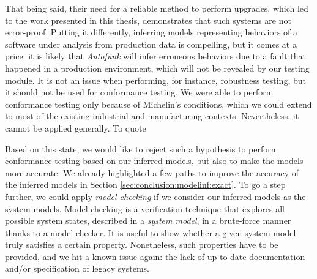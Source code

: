 That being said, their need for a reliable method to perform
upgrades, which led to the work presented in this thesis,
demonstrates that such systems are not error-proof. Putting it
differently, inferring models representing behaviors of a
software under analysis from production data is compelling, but
it comes at a price: it is likely that \textit{Autofunk} will
infer erroneous behaviors due to a fault that happened in a
production environment, which will not be revealed by our testing
module. It is not an issue when performing, for instance,
robustness testing, but it should not be used for conformance
testing. We were able to perform conformance testing only because
of Michelin's conditions, which we could extend to most of the
existing industrial and manufacturing contexts. Nevertheless, it
cannot be applied generally. To quote

Based on this state, we would like to reject such a hypothesis to
perform conformance testing based on our inferred models, but
also to make the models more accurate. We already highlighted a
few paths to improve the accuracy of the inferred models in
Section \ref{sec:conclusion:modelinf:exact}. To go a step
further, we could apply \emph{model checking}
\cite{baier2008principles} if we consider our inferred models as
the system models. Model checking is a verification technique
that explores all possible system states, described in a
\textit{system model}, in a brute-force manner thanks to a model
checker. It is useful to show whether a given system model truly
satisfies a certain property.  Nonetheless, such properties have
to be provided, and we hit a known issue again: the lack of
up-to-date documentation and/or specification of legacy systems.
